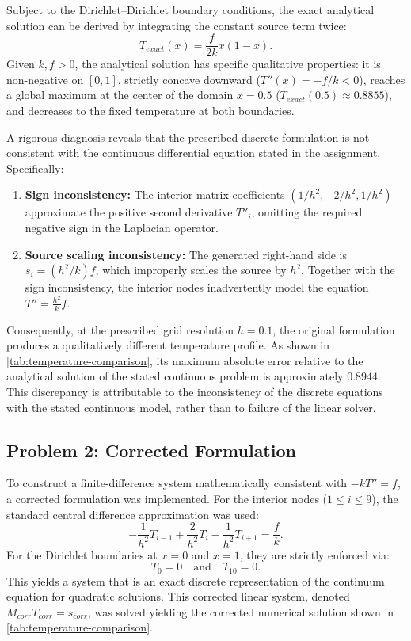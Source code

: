 Subject to the Dirichlet--Dirichlet boundary conditions, the exact analytical solution can be derived by integrating the constant source term twice:
\begin{equation} \label{eq:exact-solution}
    T_{exact}(x) = \frac{f}{2k} x (1 - x).
\end{equation}
Given $k, f > 0$, the analytical solution has specific qualitative properties: it is non-negative on $[0,1]$, strictly concave downward ($T''(x) = -f/k < 0$), reaches a global maximum at the center of the domain $x=0.5$ ($T_{exact}(0.5) \approx 0.8855$), and decreases to the fixed temperature at both boundaries.

A rigorous diagnosis reveals that the prescribed discrete formulation is not consistent with the continuous differential equation stated in the assignment. Specifically:
\begin{enumerate}
    \item \textbf{Sign inconsistency:} The interior matrix coefficients $(1/h^2, -2/h^2, 1/h^2)$ approximate the positive second derivative $T''_{i}$, omitting the required negative sign in the Laplacian operator.
    \item \textbf{Source scaling inconsistency:} The generated right-hand side is $s_i = (h^2/k) f$, which improperly scales the source by $h^2$. Together with the sign inconsistency, the interior nodes inadvertently model the equation $T'' = \frac{h^2}{k}f$.
\end{enumerate}
Consequently, at the prescribed grid resolution $h=0.1$, the original formulation produces a qualitatively different temperature profile. As shown in \autoref{tab:temperature-comparison}, its maximum absolute error relative to the analytical solution of the stated continuous problem is approximately $0.8944$. This discrepancy is attributable to the inconsistency of the discrete equations with the stated continuous model, rather than to failure of the linear solver.

\subsection{Problem 2: Corrected Formulation}

To construct a finite-difference system mathematically consistent with $-k T'' = f$, a corrected formulation was implemented. For the interior nodes ($1 \le i \le 9$), the standard central difference approximation was used:
\begin{equation}
    -\frac{1}{h^2} T_{i-1} + \frac{2}{h^2} T_{i} - \frac{1}{h^2} T_{i+1} = \frac{f}{k}.
\end{equation}
For the Dirichlet boundaries at $x=0$ and $x=1$, they are strictly enforced via:
\begin{equation}
    T_0 = 0 \quad \text{and} \quad T_{10} = 0.
\end{equation}
This yields a system that is an exact discrete representation of the continuum equation for quadratic solutions.
This corrected linear system, denoted $M_{corr} T_{corr} = s_{corr}$, was solved yielding the corrected numerical solution shown in \autoref{tab:temperature-comparison}.

